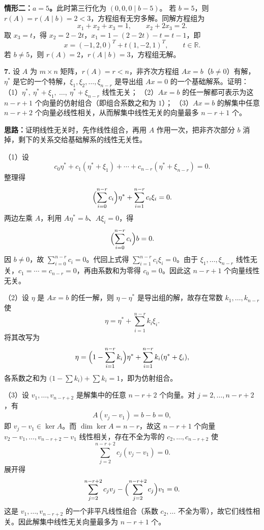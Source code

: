 \textbf{情形二：$a=5$。}此时第三行化为 $(0,0,0\mid b-5)$。
若 $b=5$，则 $r(A)=r(A\mid b)=2<3$，方程组有无穷多解。同解方程组为
\[
x_1+x_2+x_3=1,\qquad x_2+2x_3=2.
\]
取 $x_3=t$，得 $x_2=2-2t$，$x_1=1-(2-2t)-t=t-1$，即
\[
x=(-1,2,0)^T+t(1,-2,1)^T,\qquad t\in\mathbb R.
\]
若 $b\neq5$，则 $r(A)=2$，$r(A\mid b)=3$，方程组无解。

\else \answerarea[10] \fi%

\textbf{7.} 设 $A$ 为 $m\times n$ 矩阵，$r(A)=r<n$，非齐次方程组 $Ax=b$（$b\neq0$）有解，$\eta^*$ 是它的一个特解，$\xi_1,\xi_2,\ldots,\xi_{n-r}$ 是导出组 $Ax=0$ 的一个基础解系。证明：
（1）$\eta^*,\ \eta^*+\xi_1,\ \ldots,\ \eta^*+\xi_{n-r}$ 线性无关；
（2）$Ax=b$ 的任一解都可表示为这 $n-r+1$ 个向量的仿射组合（即组合系数之和为 $1$）；
（3）$Ax=b$ 的解集中任意 $n-r+2$ 个向量必线性相关，从而解集中线性无关的向量最多 $n-r+1$ 个。

\ifshowsolutions%

\textbf{思路：}证明线性无关时，先作线性组合，再用 $A$ 作用一次，把非齐次部分 $b$ 消掉，剩下的关系交给基础解系的线性无关性。

（1）设
\[
c_0\eta^*+c_1(\eta^*+\xi_1)+\cdots+c_{n-r}(\eta^*+\xi_{n-r})=0.
\]
整理得
\[
\Bigl(\sum_{i=0}^{n-r}c_i\Bigr)\eta^*+\sum_{i=1}^{n-r}c_i\xi_i=0.
\]
两边左乘 $A$，利用 $A\eta^*=b$、$A\xi_i=0$，得
\[
\Bigl(\sum_{i=0}^{n-r}c_i\Bigr)b=0.
\]
因 $b\neq0$，故 $\sum_{i=0}^{n-r}c_i=0$。代回上式得 $\sum_{i=1}^{n-r}c_i\xi_i=0$。由于 $\xi_1,\ldots,\xi_{n-r}$ 线性无关，$c_1=\cdots=c_{n-r}=0$，再由系数和为零得 $c_0=0$。因此这 $n-r+1$ 个向量线性无关。

（2）设 $\eta$ 是 $Ax=b$ 的任一解，则 $\eta-\eta^*$ 是导出组的解，故存在常数 $k_1,\ldots,k_{n-r}$ 使
\[
\eta=\eta^*+\sum_{i=1}^{n-r}k_i\xi_i.
\]
将其改写为
\[
\eta=\Bigl(1-\sum_{i=1}^{n-r}k_i\Bigr)\eta^*+\sum_{i=1}^{n-r}k_i(\eta^*+\xi_i),
\]
各系数之和为 $\bigl(1-\sum k_i\bigr)+\sum k_i=1$，即为仿射组合。

（3）设 $v_1,\ldots,v_{n-r+2}$ 是解集中的任意 $n-r+2$ 个向量。对 $j=2,\ldots,n-r+2$，有
\[
A(v_j-v_1)=b-b=0,
\]
即 $v_j-v_1\in\ker A$。而 $\dim\ker A=n-r$，故这 $n-r+1$ 个向量 $v_2-v_1,\ldots,v_{n-r+2}-v_1$ 线性相关，存在不全为零的 $c_2,\ldots,c_{n-r+2}$ 使
\[
\sum_{j=2}^{n-r+2}c_j(v_j-v_1)=0.
\]
展开得
\[
\sum_{j=2}^{n-r+2}c_jv_j-\Bigl(\sum_{j=2}^{n-r+2}c_j\Bigr)v_1=0.
\]
这是 $v_1,\ldots,v_{n-r+2}$ 的一个非平凡线性组合（系数 $c_2,\ldots$ 不全为零），故它们线性相关。因此解集中线性无关向量最多为 $n-r+1$ 个。


